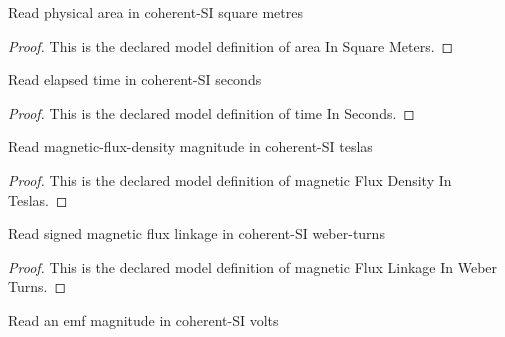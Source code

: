 \begin{definition}
  \label{def:physics:phyx-mini-0933:phyxminiproblems-problemphyxmini0933-areainsquaremeters}
  Read physical area in coherent-SI square metres
\end{definition}
\begin{proof}
  This is the declared model definition of area In Square Meters.
\end{proof}
\begin{definition}
  \label{def:physics:phyx-mini-0933:phyxminiproblems-problemphyxmini0933-timeinseconds}
  Read elapsed time in coherent-SI seconds
\end{definition}
\begin{proof}
  This is the declared model definition of time In Seconds.
\end{proof}
\begin{definition}
  \label{def:physics:phyx-mini-0933:phyxminiproblems-problemphyxmini0933-magneticfluxdensityinteslas}
  Read magnetic-flux-density magnitude in coherent-SI teslas
\end{definition}
\begin{proof}
  This is the declared model definition of magnetic Flux Density In Teslas.
\end{proof}
\begin{definition}
  \label{def:physics:phyx-mini-0933:phyxminiproblems-problemphyxmini0933-magneticfluxlinkageinweberturns}
  Read signed magnetic flux linkage in coherent-SI weber-turns
\end{definition}
\begin{proof}
  This is the declared model definition of magnetic Flux Linkage In Weber Turns.
\end{proof}
\begin{definition}
  \label{def:physics:phyx-mini-0933:phyxminiproblems-problemphyxmini0933-emfmagnitudeinvolts}
  Read an emf magnitude in coherent-SI volts
\end{definition}
